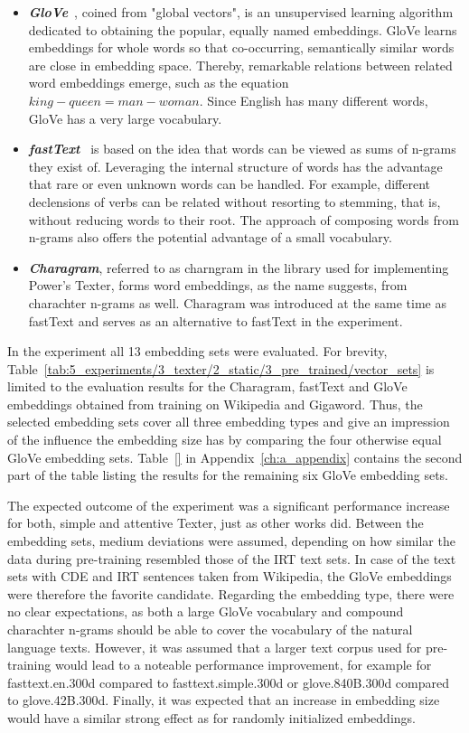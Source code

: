 \begin{itemize}
    \item \textbf{\emph{GloVe}}~\cite{Pennington2014GloveGV}, coined from "global vectors", is an unsupervised learning algorithm dedicated to obtaining the popular, equally named embeddings. GloVe learns embeddings for whole words so that co-occurring, semantically similar words are close in embedding space. Thereby, remarkable relations between related word embeddings emerge, such as the equation $king - queen = man - woman$. Since English has many different words, GloVe has a very large vocabulary.

    \item \textbf{\emph{fastText}}~\cite{Bojanowski2017EnrichingWV,Mikolov2018AdvancesIP}  is based on the idea that words can be viewed as sums of n-grams they exist of. Leveraging the internal structure of words has the advantage that rare or even unknown words can be handled. For example, different declensions of verbs can be related without resorting to stemming, that is, without reducing words to their root. The approach of composing words from n-grams also offers the potential advantage of a small vocabulary.

    \item \textbf{\emph{Charagram}}, referred to as charngram in the library used for implementing Power's Texter, forms word embeddings, as the name suggests, from charachter n-grams as well. Charagram was introduced at the same time as fastText and serves as an alternative to fastText in the experiment.
\end{itemize}

In the experiment all 13 embedding sets were evaluated. For brevity, Table~\ref{tab:5_experiments/3_texter/2_static/3_pre_trained/vector_sets} is limited to the evaluation results for the Charagram, fastText and GloVe embeddings obtained from training on Wikipedia and Gigaword. Thus, the selected embedding sets cover all three embedding types and give an impression of the influence the embedding size has by comparing the four otherwise equal GloVe embedding sets. Table~\ref{} in Appendix~\ref{ch:a_appendix} contains the second part of the table listing the results for the remaining six GloVe embedding sets.

The expected outcome of the experiment was a significant performance increase for both, simple and attentive Texter, just as other works did. Between the embedding sets, medium deviations were assumed, depending on how similar the data during pre-training resembled those of the IRT text sets. In case of the text sets with CDE and IRT sentences taken from Wikipedia, the GloVe embeddings were therefore the favorite candidate. Regarding the embedding type, there were no clear expectations, as both a large GloVe vocabulary and compound charachter n-grams should be able to cover the vocabulary of the natural language texts. However, it was assumed that a larger text corpus used for pre-training would lead to a noteable performance improvement, for example for fasttext.en.300d compared to fasttext.simple.300d or glove.840B.300d compared to glove.42B.300d. Finally, it was expected that an increase in embedding size would have a similar strong effect as for randomly initialized embeddings.

